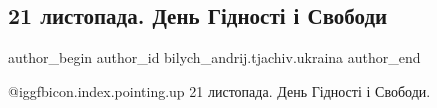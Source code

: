  
 
 
 
 
 
\subsection{21 листопада. День Гідності і Свободи}
\label{sec:21_11_2021.fb.bilych_andrij.tjachiv.ukraina.1.den_gidnosti_i_svobody}
 
\ifcmt
 author_begin
   author_id bilych_andrij.tjachiv.ukraina
 author_end
\fi

@igg{fbicon.index.pointing.up} 21 листопада. День Гідності і Свободи. 



